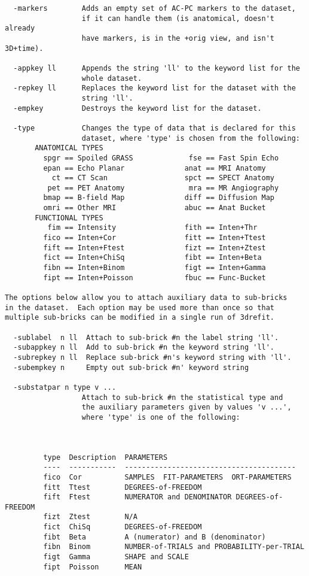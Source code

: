\begin{verbatim}
  -markers        Adds an empty set of AC-PC markers to the dataset,
                  if it can handle them (is anatomical, doesn't already
                  have markers, is in the +orig view, and isn't 3D+time).

  -appkey ll      Appends the string 'll' to the keyword list for the
                  whole dataset.
  -repkey ll      Replaces the keyword list for the dataset with the
                  string 'll'.
  -empkey         Destroys the keyword list for the dataset.

  -type           Changes the type of data that is declared for this
                  dataset, where 'type' is chosen from the following:
       ANATOMICAL TYPES
         spgr == Spoiled GRASS             fse == Fast Spin Echo
         epan == Echo Planar              anat == MRI Anatomy
           ct == CT Scan                  spct == SPECT Anatomy
          pet == PET Anatomy               mra == MR Angiography
         bmap == B-field Map              diff == Diffusion Map
         omri == Other MRI                abuc == Anat Bucket
       FUNCTIONAL TYPES
          fim == Intensity                fith == Inten+Thr
         fico == Inten+Cor                fitt == Inten+Ttest
         fift == Inten+Ftest              fizt == Inten+Ztest
         fict == Inten+ChiSq              fibt == Inten+Beta
         fibn == Inten+Binom              figt == Inten+Gamma
         fipt == Inten+Poisson            fbuc == Func-Bucket

The options below allow you to attach auxiliary data to sub-bricks
in the dataset.  Each option may be used more than once so that
multiple sub-bricks can be modified in a single run of 3drefit.

  -sublabel  n ll  Attach to sub-brick #n the label string 'll'.
  -subappkey n ll  Add to sub-brick #n the keyword string 'll'.
  -subrepkey n ll  Replace sub-brick #n's keyword string with 'll'.
  -subempkey n     Empty out sub-brick #n' keyword string

  -substatpar n type v ...
                  Attach to sub-brick #n the statistical type and
                  the auxiliary parameters given by values 'v ...',
                  where 'type' is one of the following:



         type  Description  PARAMETERS
         ----  -----------  ----------------------------------------
         fico  Cor          SAMPLES  FIT-PARAMETERS  ORT-PARAMETERS
         fitt  Ttest        DEGREES-of-FREEDOM
         fift  Ftest        NUMERATOR and DENOMINATOR DEGREES-of-FREEDOM
         fizt  Ztest        N/A
         fict  ChiSq        DEGREES-of-FREEDOM
         fibt  Beta         A (numerator) and B (denominator)
         fibn  Binom        NUMBER-of-TRIALS and PROBABILITY-per-TRIAL
         figt  Gamma        SHAPE and SCALE
         fipt  Poisson      MEAN
\end{verbatim}

